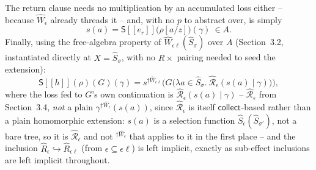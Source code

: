 \documentclass[11pt]{article}
\theoremstyle{plain}
\newcommand{\Ssem}[1]{\mathsf{S}[\![#1]\!]}
\newcommand{\Wm}[1]{\widehat{W}_{#1}}
\newcommand{\Rm}[1]{\widehat{R}_{#1}}
\newcommand{\Sm}[1]{\widehat{S}_{#1}}
\newcommand{\eps}{\epsilon}
\newcommand{\dg}[1]{^{\dagger #1}}
\newcommand{\collectX}[1]{\mathsf{collect}_{#1}}
\newcommand{\Rx}[1]{\widehat{\mathcal R}_{#1}}
\begin{document}
The return clause needs no multiplication by an accumulated loss either -- because
$\Wm\eps$ already threads it -- and, with no $p$ to abstract over, is simply
\[
  s(a) = \Ssem{e_r}\big(\rho[a/z]\big)(\gamma) \ \in A.
\]
Finally, using the free-algebra property of $\Wm{\eps\ell}(\Sm\sigma)$ over $A$
(Section~3.2, instantiated directly at $X = \Sm\sigma$, with no $R\times$ pairing needed to
seed the extension):
\[
  \Ssem{h}(\rho)(G)(\gamma) = s\dg{\Wm{\eps\ell}}\Big(G\big(\lambda a\in\Sm\sigma.\
    \Rx\eps(s(a)\mid\gamma)\big)\Big),
\]
where the loss fed to $G$'s own continuation is $\Rx\eps(s(a)\mid\gamma)$ -- $\Rx\eps$ from
Section~3.4, \emph{not} a plain $\gamma\dg{\Wm\eps}(s(a))$, since $\Rx\eps$ is itself
$\collectX{}$-based rather than a plain homomorphic extension: $s(a)$ is a selection
function $\widehat S_\eps(\Sm{\sigma'})$, not a bare tree, so it is $\Rx\eps$ and not
$\dg{\Wm\eps}$ that applies to it in the first place -- and the inclusion
$\Rm\eps\hookrightarrow\Rm{\eps\ell}$ (from $\eps\subseteq\eps\ell$) is left implicit,
exactly as sub-effect inclusions are left implicit throughout.
\end{document}
